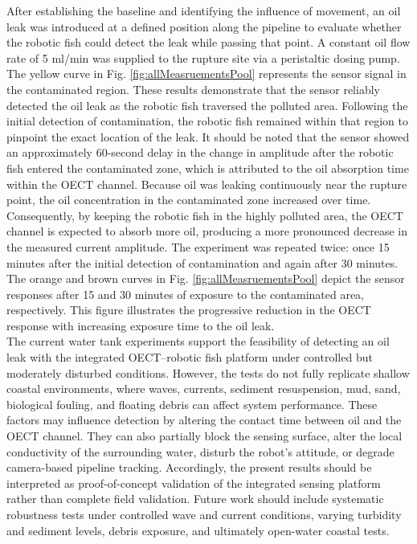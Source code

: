 \documentclass{iopjournal}
\begin{document}
After establishing the baseline and identifying the influence of movement, an oil leak was introduced at a defined position along the pipeline to evaluate whether the robotic fish could detect the leak while passing that point. A constant oil flow rate of 5 ml/min was supplied to the rupture site via a peristaltic dosing pump. The yellow curve in Fig. \ref{fig:allMeasruementsPool} represents the sensor signal in the contaminated region. These results demonstrate that the sensor reliably detected the oil leak as the robotic fish traversed the polluted area. Following the initial detection of contamination, the robotic fish remained within that region to pinpoint the exact location of the leak. It should be noted that the sensor showed an approximately 60-second delay in the change in amplitude after the robotic fish entered the contaminated zone, which is attributed to the oil absorption time within the OECT channel. Because oil was leaking continuously near the rupture point, the oil concentration in the contaminated zone increased over time. Consequently, by keeping the robotic fish in the highly polluted area, the OECT channel is expected to absorb more oil, producing a more pronounced decrease in the measured current amplitude. The experiment was repeated twice: once 15 minutes after the initial detection of contamination and again after 30 minutes. The orange and brown curves in Fig. \ref{fig:allMeasruementsPool} depict the sensor responses after 15 and 30 minutes of exposure to the contaminated area, respectively. This figure illustrates the progressive reduction in the OECT response with increasing exposure time to the oil leak. 
\\
The current water tank experiments support the feasibility of detecting an oil leak with the integrated OECT–robotic fish platform under controlled but moderately disturbed conditions. However, the tests do not fully replicate shallow coastal environments, where waves, currents, sediment resuspension, mud, sand, biological fouling, and floating debris can affect system performance. These factors may influence detection by altering the contact time between oil and the OECT channel. They can also partially block the sensing surface, alter the local conductivity of the surrounding water, disturb the robot’s attitude, or degrade camera-based pipeline tracking. Accordingly, the present results should be interpreted as proof-of-concept validation of the integrated sensing platform rather than complete field validation. Future work should include systematic robustness tests under controlled wave and current conditions, varying turbidity and sediment levels, debris exposure, and ultimately open-water coastal tests.
\end{document}
